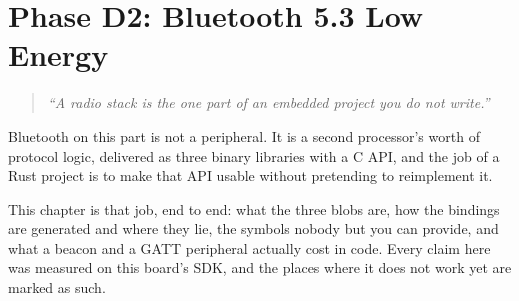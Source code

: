 
\chapter{Phase D2: Bluetooth 5.3 Low Energy}
\label{ch:chapter-11}

\begin{quote}
    \textit{``A radio stack is the one part of an embedded project you do not write.''}
\end{quote}

Bluetooth on this part is not a peripheral. It is a second processor's worth of protocol logic,
delivered as three binary libraries with a C API, and the job of a Rust project is to make that API
usable without pretending to reimplement it.

This chapter is that job, end to end: what the three blobs are, how the bindings are generated and
where they lie, the symbols nobody but you can provide, and what a beacon and a GATT peripheral
actually cost in code. Every claim here was measured on this board's SDK, and the places where it does
not work yet are marked as such.

\minitoc

\clearpage









\clearpage

